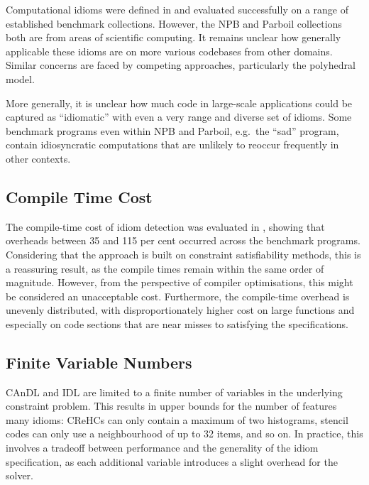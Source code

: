     Computational idioms were defined in
     and
    evaluated successfully on a range of established benchmark collections.
    However, the NPB and Parboil collections both are from areas of scientific
    computing.
    It remains unclear how generally applicable these idioms are on more
    various codebases from other domains.
    Similar concerns are faced by competing approaches, particularly the
    polyhedral model.

    More generally, it is unclear how much code in large-scale applications
    could be captured as ``idiomatic'' with even a very range and diverse set of
    idioms.
    Some benchmark programs even within NPB and Parboil, e.g.\ the ``sad''
    program, contain idiosyncratic computations that are unlikely to reoccur
    frequently in other contexts.

\subsection*{Compile Time Cost}

    The compile-time cost of idiom detection was evaluated in
    , showing that overheads between 35 and 115 per cent
    occurred across the benchmark programs.
    Considering that the approach is built on constraint satisfiability
    methods, this is a reassuring result, as the compile times remain within the
    same order of magnitude.
    However, from the perspective of compiler optimisations, this might be
    considered an unacceptable cost.
    Furthermore, the compile-time overhead is unevenly distributed, with
    disproportionately higher cost on large functions and especially on code
    sections that are near misses to satisfying the specifications.

\subsection*{Finite Variable Numbers}

    CAnDL and IDL are limited to a finite number of variables in the underlying
    constraint problem.
    This results in upper bounds for the number of features many idioms:
    CReHCs can only contain a maximum of two histograms, stencil codes can only
    use a neighbourhood of up to 32 items, and so on.
    In practice, this involves a tradeoff between performance and the generality
    of the idiom specification, as each additional variable introduces a slight
    overhead for the solver.

